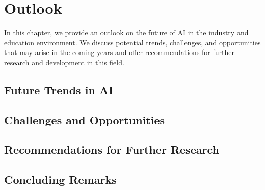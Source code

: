 \chapter{Outlook}
\label{chap:Outlook}

In this chapter, we provide an outlook on the future of AI in the industry and education environment. We discuss potential trends, challenges, and opportunities that may arise in the coming years and offer recommendations for further research and development in this field.

\section{Future Trends in AI}

\section{Challenges and Opportunities}

\section{Recommendations for Further Research}

\section{Concluding Remarks}
